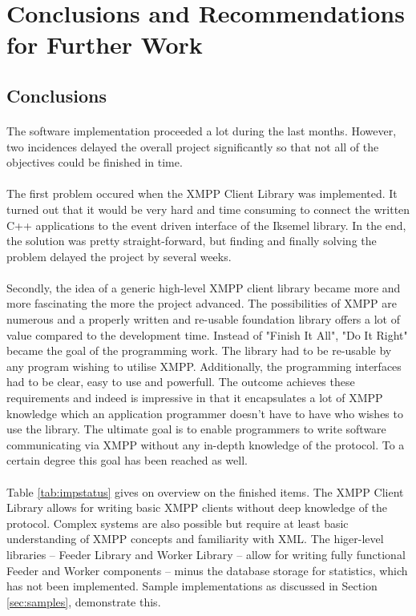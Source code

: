 \section{Conclusions and Recommendations for Further Work}

\subsection{Conclusions}
\label{sec:conclusions}
\paragraph{}
The software implementation proceeded a lot during the last months. However, two incidences delayed the overall project significantly so that not all of the objectives could be finished in time.

\paragraph{}
The first problem occured when the XMPP Client Library was implemented. It turned out that it would be very hard and time consuming to connect the written C++ applications to the event driven interface of the Iksemel library. In the end, the solution was pretty straight-forward, but finding and finally solving the problem delayed the project by several weeks.

\paragraph{}
Secondly, the idea of a generic high-level XMPP client library became more and more fascinating the more the project advanced. The possibilities of XMPP are numerous and a properly written and re-usable foundation library offers a lot of value compared to the development time. Instead of "Finish It All", "Do It Right" became the goal of the programming work. The library had to be re-usable by any program wishing to utilise XMPP. Additionally, the programming interfaces had to be clear, easy to use and powerfull. The outcome achieves these requirements and indeed is impressive in that it encapsulates a lot of XMPP knowledge which an application programmer doesn't have to have who wishes to use the library. The ultimate goal is to enable programmers to write software communicating via XMPP without any in-depth knowledge of the protocol. To a certain degree this goal has been reached as well.

\paragraph{}
Table \ref{tab:impstatus} gives on overview on the finished items. The XMPP Client Library allows for writing basic XMPP clients without deep knowledge of the protocol. Complex systems are also possible but require at least basic understanding of XMPP concepts and familiarity with XML. The higer-level libraries -- Feeder Library and Worker Library -- allow for writing fully functional Feeder and Worker components -- minus the database storage for statistics, which has not been implemented. Sample implementations as discussed in Section \ref{sec:samples}, demonstrate this.

